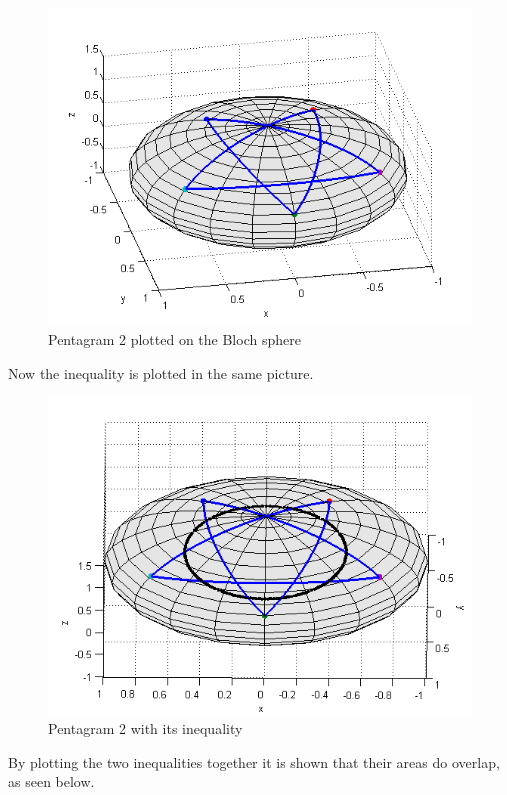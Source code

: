 \begin{figure}[H]
\begin{center}
\includegraphics[scale=0.6]{penta2.png}
\caption{Pentagram 2 plotted on the Bloch sphere}
\label{fig:penta2}
\end{center}
\end{figure}
Now the inequality is plotted in the same picture.
\begin{figure}[H]
\begin{center}
\includegraphics[scale=0.6]{sphere2ine.png}
\caption{Pentagram 2 with its inequality}
\end{center}
\end{figure}
By plotting the two inequalities together it is shown that their areas do overlap, as seen below.

